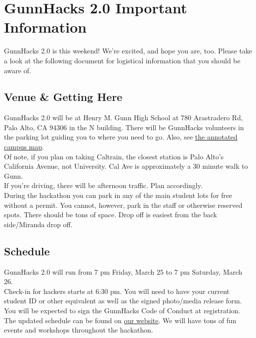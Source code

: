 \documentclass[12pt,onesided,letterpaper]{article}
\begin{document}
\section*{GunnHacks 2.0 Important Information}

GunnHacks 2.0 is this weekend! We're excited, and hope you are, too. Please take a look at the following document for logistical information that you should be aware of.

\subsection*{Venue \& Getting Here}

GunnHacks 2.0 will be at Henry M. Gunn High School at 780 Arastradero Rd, Palo Alto, CA 94306 in the N building. There will be GunnHacks volunteers in the parking lot guiding you to where you need to go. Also, see \href{https://gunnhacks.com/map.pdf}{\underline{the annotated campus map}}.\\

Of note, if you plan on taking Caltrain, the closest station is Palo Alto's California Avenue, not University. Cal Ave is approximately a 30 minute walk to Gunn.\\

If you're driving, there will be afternoon traffic. Plan accordingly.\\

During the hackathon you can park in any of the main student lots for free without a permit. You cannot, however, park in the staff or otherwise reserved spots. There should be tons of space. Drop off is easiest from the back side\slash Miranda drop off.

\subsection*{Schedule}

GunnHacks 2.0 will run from 7 pm Friday, March 25 to 7 pm Saturday, March 26.\\

Check-in for hackers starts at 6:30 pm. You will need to have your current student ID or other equivalent as well as the signed photo\slash media release form. You will be expected to sign the GunnHacks Code of Conduct at registration.\\

The updated schedule can be found on \href{https://gunnhacks.com}{\underline{our website}}. We will have tons of fun events and workshops throughout the hackathon.
\end{document}
